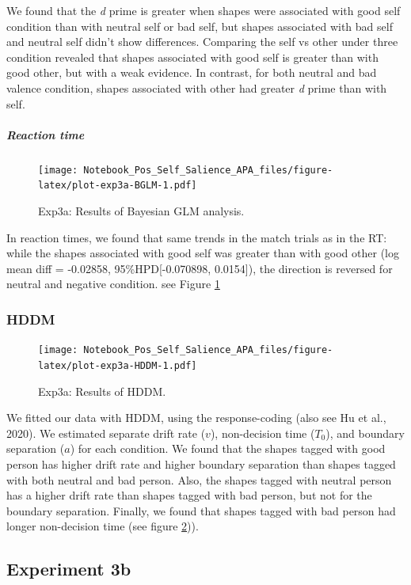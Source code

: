\documentclass[
  english,
  man]{apa6}
\let\oldsubparagraph\subparagraph
\renewcommand{\subparagraph}[1]{\oldsubparagraph{#1}\mbox{}}
\begin{document}
We found that the \emph{d} prime is greater when shapes were associated with good self condition than with neutral self or bad self, but shapes associated with bad self and neutral self didn't show differences. Comparing the self vs other under three condition revealed that shapes associated with good self is greater than with good other, but with a weak evidence. In contrast, for both neutral and bad valence condition, shapes associated with other had greater \emph{d} prime than with self.

\hypertarget{reaction-time-5}{%
\subparagraph{Reaction time}\label{reaction-time-5}}

\begin{figure}
\centering
\texttt{[image: Notebook\_Pos\_Self\_Salience\_APA\_files/figure-latex/plot-exp3a-BGLM-1.pdf]}
\caption{\label{fig:plot-exp3a-BGLM}Exp3a: Results of Bayesian GLM analysis.}
\end{figure}

In reaction times, we found that same trends in the match trials as in the RT: while the shapes associated with good self was greater than with good other (log mean diff = -0.02858, 95\%HPD{[}-0.070898, 0.0154{]}), the direction is reversed for neutral and negative condition. see Figure \ref{fig:plot-exp3a-BGLM}

\hypertarget{hddm-4}{%
\subsubsection{HDDM}\label{hddm-4}}

\begin{figure}
\centering
\texttt{[image: Notebook\_Pos\_Self\_Salience\_APA\_files/figure-latex/plot-exp3a-HDDM-1.pdf]}
\caption{\label{fig:plot-exp3a-HDDM}Exp3a: Results of HDDM.}
\end{figure}

We fitted our data with HDDM, using the response-coding (also see Hu et al., 2020). We estimated separate drift rate (\(v\)), non-decision time (\(T_{0}\)), and boundary separation (\(a\)) for each condition. We found that the shapes tagged with good person has higher drift rate and higher boundary separation than shapes tagged with both neutral and bad person. Also, the shapes tagged with neutral person has a higher drift rate than shapes tagged with bad person, but not for the boundary separation. Finally, we found that shapes tagged with bad person had longer non-decision time (see figure \ref{fig:plot-exp3a-HDDM})).

\hypertarget{experiment-3b}{%
\subsection{Experiment 3b}\label{experiment-3b}}
\end{document}
